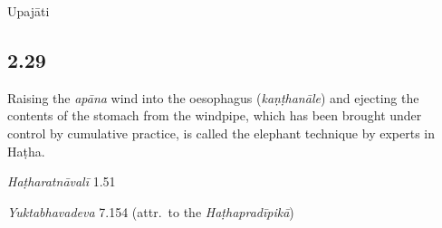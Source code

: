 \begin{ekdosis}
\begin{testimonia}[hp02_028]
\begin{versinnote}
\end{versinnote}
\end{testimonia}


\begin{metre}[hp02_028]
Upajāti
\end{metre}

\subsection*{2.29}
\begin{translation}[hp02_029]
Raising the \emph{apāna} wind into the oesophagus (\emph{kaṇṭhanāle}) and ejecting the contents of the stomach from the windpipe, which has been brought under control by cumulative practice, is called the elephant technique by experts in Haṭha.
\end{translation}

\begin{sources}[hp02_029]
\end{sources}

\begin{testimonia}[hp02_029]
\emph{Haṭharatnāvalī} 1.51

\begin{versinnote}
\end{versinnote}

\emph{Yuktabhavadeva} 7.154 (attr.~to the \emph{Haṭhapradīpikā})

\begin{versinnote}
\end{versinnote}


\end{testimonia}
\end{ekdosis}
